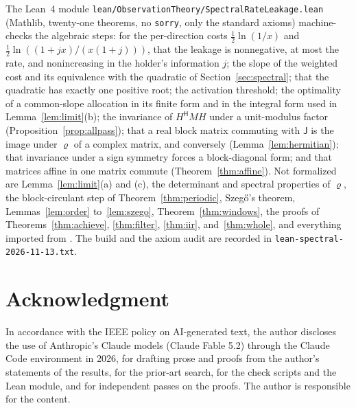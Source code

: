 \documentclass[11pt,onecolumn]{IEEEtran}
\newcommand{\herm}{\mathsf H}
\begin{document}
The Lean~4 module
\texttt{lean/ObservationTheory/SpectralRateLeakage.lean} (Mathlib,
twenty-one theorems, no \texttt{sorry}, only the standard axioms)
machine-checks the algebraic steps: for the per-direction costs
$\tfrac12\ln(1/x)$ and $\tfrac12\ln((1+jx)/(x(1+j)))$, that the leakage
is nonnegative, at most the rate, and nonincreasing in the holder's
information $j$; the slope of the weighted cost and its equivalence
with the quadratic of Section~\ref{sec:spectral}; that the quadratic
has exactly one positive root; the activation threshold; the optimality
of a common-slope allocation in its finite form and in the integral
form used in Lemma~\ref{lem:limit}(b); the invariance of
$H^{\herm}MH$ under a unit-modulus factor
(Proposition~\ref{prop:allpass}); that a real block matrix commuting
with $\mathsf J$ is the image under $\varrho$ of a complex matrix, and
conversely (Lemma~\ref{lem:hermitian}); that invariance under a sign
symmetry forces a block-diagonal form; and that matrices affine in one
matrix commute (Theorem~\ref{thm:affine}). Not formalized are
Lemma~\ref{lem:limit}(a) and (c), the determinant and spectral
properties of $\varrho$, the block-circulant step of
Theorem~\ref{thm:periodic}, Szeg\H{o}'s theorem,
Lemmas~\ref{lem:order} to~\ref{lem:szego}, Theorem~\ref{thm:windows}, the
proofs of Theorems~\ref{thm:achieve}, \ref{thm:filter},
\ref{thm:iir}, and~\ref{thm:whole}, and
everything imported from \cite{part1}. The build and the axiom audit are recorded
in \texttt{lean-spectral-2026-11-13.txt}.

\section*{Acknowledgment}

In accordance with the IEEE policy on AI-generated text, the author
discloses the use of Anthropic's Claude models (Claude Fable 5.2)
through the Claude Code environment in 2026, for drafting prose and
proofs from the author's statements of the results, for the prior-art
search, for the check scripts and the Lean module, and for independent
passes on the proofs. The author is responsible for the content.
\end{document}
